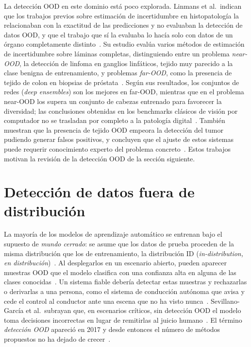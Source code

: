 La detección OOD en este dominio está poco explorada. Linmans et al.\ indican que
los trabajos previos sobre estimación de incertidumbre en histopatología la
relacionaban con la exactitud de las predicciones y no evaluaban la detección de
datos OOD, y que el trabajo que sí la evaluaba lo hacía solo con datos de un órgano
completamente distinto~\cite{linmans2023}. Su estudio evalúa varios métodos de
estimación de incertidumbre sobre láminas completas, distinguiendo entre un
problema \emph{near-OOD}, la detección de linfoma en ganglios linfáticos, tejido
muy parecido a la clase benigna de entrenamiento, y problemas \emph{far-OOD},
como la presencia de tejido de colon en biopsias de próstata~\cite{linmans2023}.
Según sus resultados, los conjuntos de redes (\emph{deep ensembles}) son los
mejores en far-OOD, mientras que en el problema near-OOD los supera un conjunto
de cabezas entrenado para favorecer la diversidad; las conclusiones obtenidas en
los benchmarks clásicos de visión por computador no se trasladan por completo a
la patología digital~\cite{linmans2023}. También muestran que la presencia de
tejido OOD empeora la detección del tumor pudiendo generar falsos positivos, y concluyen que el ajuste de estos
sistemas puede requerir conocimiento experto del problema concreto~\cite{linmans2023}.
Estos trabajos motivan la revisión de la detección OOD de la sección siguiente.

\section{Detección de datos fuera de distribución}\label{sec:ea-ood}

La mayoría de los modelos de aprendizaje automático se entrenan bajo el supuesto
de \emph{mundo cerrado}: se asume que los datos de prueba proceden de la misma
distribución que los de entrenamiento, la distribución ID
(\emph{in-distribution, en distribución})~\cite{yang2024}. Al desplegarlos en un escenario
abierto, pueden aparecer muestras OOD que el modelo clasifica con una confianza
alta en alguna de las clases conocidas~\cite{yang2024}. Un sistema fiable debería
detectar estas muestras y rechazarlas o derivarlas a una persona, como el sistema
de conducción autónoma que avisa y cede el control al conductor ante una escena
que no ha visto nunca~\cite{yang2024}. Sevillano-García et al.\ subrayan que,
en escenarios críticos, sin detección OOD el modelo toma decisiones incorrectas en
lugar de remitirlas al juicio humano~\cite{sevillano2026}. El término
\emph{detección OOD} apareció en 2017 y desde entonces el número de métodos
propuestos no ha dejado de crecer~\cite{yang2024}.

